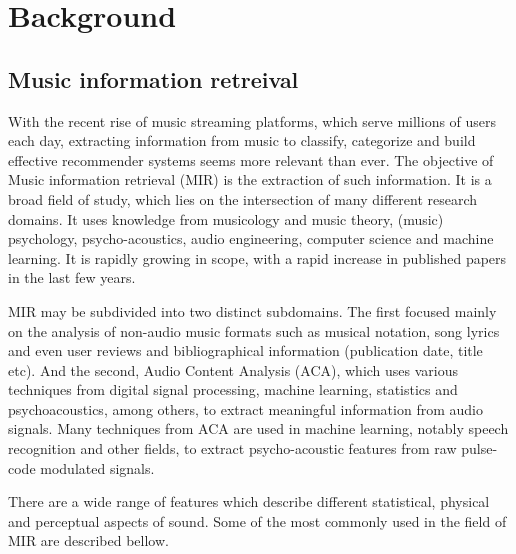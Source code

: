 \documentclass[11pt]{article}
\begin{document}
\section{Background}
\label{sec:org4d1b31d}
\subsection{Music information retreival}
\label{sec:orge32af72}

With the recent rise of music streaming platforms, which serve millions of users each day, extracting information from music to classify, categorize and build effective recommender systems seems more relevant than ever.
The objective of Music information retrieval (MIR) is the extraction of such information. It is a broad field of study, which lies on the intersection of many different research domains. It uses knowledge from musicology and music theory, (music) psychology, psycho-acoustics, audio engineering, computer science and machine learning. It is rapidly growing in scope, with a rapid increase in published papers in the last few years.

MIR may be subdivided into two distinct subdomains. The first focused mainly on the analysis of non-audio music formats such as musical notation, song lyrics and even user reviews and bibliographical information (publication date, title etc). And the second, Audio Content Analysis (ACA), which uses various techniques from digital signal processing, machine learning, statistics and psychoacoustics, among others, to extract meaningful information from audio signals. Many techniques from ACA are used in machine learning, notably speech recognition and other fields, to extract psycho-acoustic features from raw pulse-code modulated signals.

There are a wide range of features which describe different statistical, physical and perceptual aspects of sound. Some of the most commonly used in the field of MIR are described bellow.

\end{document}
